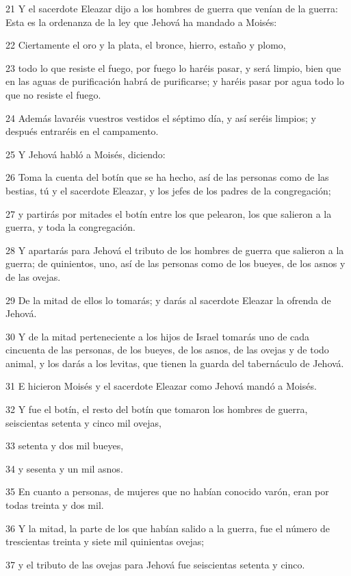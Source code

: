 \par 21 Y el sacerdote Eleazar dijo a los hombres de guerra que venían de la guerra: Esta es la ordenanza de la ley que Jehová ha mandado a Moisés:
\par 22 Ciertamente el oro y la plata, el bronce, hierro, estaño y plomo, 
\par 23 todo lo que resiste el fuego, por fuego lo haréis pasar, y será limpio, bien que en las aguas de purificación habrá de purificarse; y haréis pasar por agua todo lo que no resiste el fuego.
\par 24 Además lavaréis vuestros vestidos el séptimo día, y así seréis limpios; y después entraréis en el campamento.
\par 25 Y Jehová habló a Moisés, diciendo:
\par 26 Toma la cuenta del botín que se ha hecho, así de las personas como de las bestias, tú y el sacerdote Eleazar, y los jefes de los padres de la congregación;
\par 27 y partirás por mitades el botín entre los que pelearon, los que salieron a la guerra, y toda la congregación.
\par 28 Y apartarás para Jehová el tributo de los hombres de guerra que salieron a la guerra; de quinientos, uno, así de las personas como de los bueyes, de los asnos y de las ovejas.
\par 29 De la mitad de ellos lo tomarás; y darás al sacerdote Eleazar la ofrenda de Jehová.
\par 30 Y de la mitad perteneciente a los hijos de Israel tomarás uno de cada cincuenta de las personas, de los bueyes, de los asnos, de las ovejas y de todo animal, y los darás a los levitas, que tienen la guarda del tabernáculo de Jehová.
\par 31 E hicieron Moisés y el sacerdote Eleazar como Jehová mandó a Moisés.
\par 32 Y fue el botín, el resto del botín que tomaron los hombres de guerra, seiscientas setenta y cinco mil ovejas,
\par 33 setenta y dos mil bueyes,
\par 34 y sesenta y un mil asnos.
\par 35 En cuanto a personas, de mujeres que no habían conocido varón, eran por todas treinta y dos mil.
\par 36 Y la mitad, la parte de los que habían salido a la guerra, fue el número de trescientas treinta y siete mil quinientas ovejas;
\par 37 y el tributo de las ovejas para Jehová fue seiscientas setenta y cinco.
